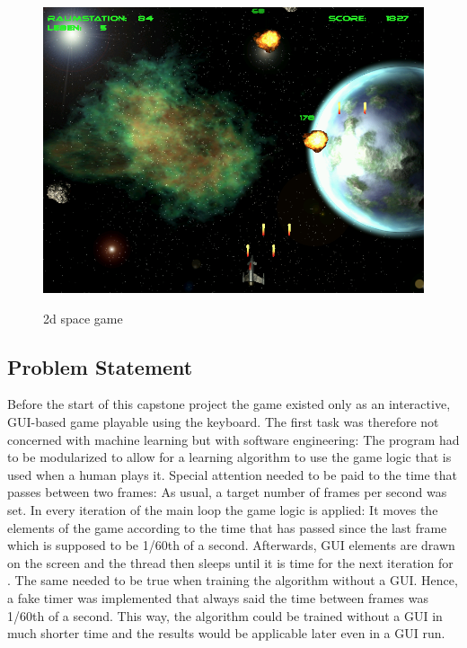 \documentclass[a4paper,10pt]{article}
\begin{document}
\begin{figure}
 \centering
 \includegraphics[width=\linewidth]{game2.png}
 \label{fig:game}
 \caption{2d space game}
\end{figure}

\subsection{Problem Statement}

Before the start of this capstone project the game existed only as an interactive, GUI-based game playable using the keyboard. 
The first task was therefore not concerned with machine learning but with software engineering:
The program had to be modularized to allow for a learning algorithm to use the game logic that is used when a human plays it.
Special attention needed to be paid to the time that passes between two frames:
As usual, a target number of frames per second was set.
In every iteration of the main loop the game logic is applied: It moves the elements of the game according to the time that has passed since the last frame which is supposed to be 1/60th of a second.
Afterwards, GUI elements are drawn on the screen and the thread then sleeps until it is time for the next iteration for .
The same needed to be true when training the algorithm without a GUI.
Hence, a fake timer was implemented that always said the time between frames was 1/60th of a second.
This way, the algorithm could be trained without a GUI in much shorter time and the results would be applicable later even in a GUI run.
\end{document}
